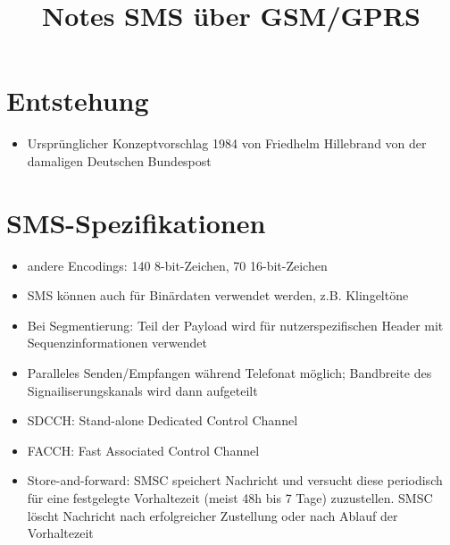 \documentclass[german,11pt,a4paper]{article}
\begin{document}
\title{\textbf{Notes SMS über GSM/GPRS}}

\maketitle

\section{Entstehung}
\begin{itemize}
	\item Ursprünglicher Konzeptvorschlag 1984 von Friedhelm Hillebrand von der 
		damaligen Deutschen Bundespost
\end{itemize}

\section{SMS-Spezifikationen}
\begin{itemize}
	\item andere Encodings: 140 8-bit-Zeichen, 70 16-bit-Zeichen
	\item SMS können auch für Binärdaten verwendet werden, z.B. Klingeltöne
	\item Bei Segmentierung: Teil der Payload wird für nutzerspezifischen Header mit 
		Sequenzinformationen verwendet
	\item Paralleles Senden/Empfangen während Telefonat möglich; Bandbreite des 
		Signailiserungskanals wird dann aufgeteilt
	\item SDCCH: Stand-alone Dedicated Control Channel
	\item FACCH: Fast Associated Control Channel
	\item Store-and-forward: SMSC speichert Nachricht und versucht diese periodisch 
		für eine festgelegte Vorhaltezeit (meist 48h bis 7 Tage) zuzustellen. 
		SMSC löscht Nachricht nach erfolgreicher Zustellung oder nach Ablauf der 
		Vorhaltezeit
\end{itemize}
\end{document}
